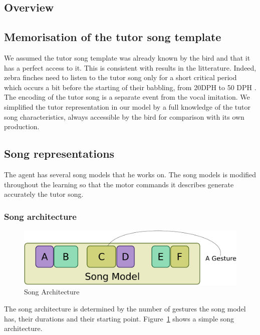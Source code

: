 \documentclass{report}
\begin{document}
\subsection{Overview}

\subsection{Memorisation of the tutor song template}

We assumed the tutor song template was already known by the bird and that it has
a perfect access to it. This is consistent with results in the litterature.
Indeed, zebra finches need to listen to the tutor song only for a short critical
period which occurs a bit before the starting of their babbling, from 20DPH to
50 DPH \parencite{deregnaucourt_how_2005, margoliash_sleep_2010}. The encoding
of the tutor song is a separate event from the vocal imitation. We simplified
the tutor representation in our model by a full knowledge of the tutor song
characteristics, always accessible by the bird for comparison with its own
production.

\subsection{Song representations}

The agent has several song models that he works on. The song models is modified
throughout the learning so that the motor commands it describes generate
accurately the tutor song.

\subsubsection{Song architecture}

\begin{figure}
\center
\includegraphics[width=0.8\linewidth]{song_model_architecture_schema}
\caption{Song Architecture\label{fig_song_arch}}
\end{figure}

The song architecture is determined by the number of gestures the song model
has, their durations and their starting point. Figure~\ref{fig_song_arch} shows
a simple song architecture.
\end{document}

